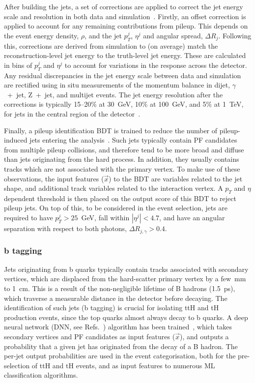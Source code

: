 After building the jets, a set of corrections are applied to correct the jet energy scale and resolution in both data and simulation~\cite{Khachatryan:2016kdb}. Firstly, an offset correction is applied to account for any remaining contributions from pileup. This depends on the event energy density, $\rho$, and the jet $p_T^j$, $\eta^j$ and angular spread, $\Delta R_j$. Following this, corrections are derived from simulation to (on average) match the reconstruction-level jet energy to the truth-level jet energy. These are calculated in bins of $p_T^j$ and $\eta^j$ to account for variations in the response across the detector. Any residual discrepancies in the jet energy scale between data and simulation are rectified using in situ measurements of the momentum balance in dijet, $\gamma$~+~jet, Z~+~jet, and multijet events. The jet energy resolution after the corrections is typically 15--20\% at 30~GeV, 10\% at 100~GeV, and 5\% at 1~TeV, for jets in the central region of the detector~\cite{Khachatryan:2016kdb}.

Finally, a pileup identification BDT is trained to reduce the number of pileup-induced jets entering the analysis~\cite{Sirunyan:2020foa}. Such jets typically contain PF candidates from multiple pileup collisions, and therefore tend to be more broad and diffuse than jets originating from the hard process. In addition, they usually contains tracks which are not associated with the primary vertex. To make use of these observations, the input features ($\vec{x}$) to the BDT are variables related to the jet shape, and additional track variables related to the interaction vertex. A $p_T$ and $\eta$ dependent threshold is then placed on the output score of this BDT to reject pileup jets. On top of this, to be considered in the event selection, jets are required to have $p_T^j>25$~GeV, fall within $|\eta^j|<4.7$, and have an angular separation with respect to both photons, $\Delta R_{j,\gamma}>0.4$.

\subsubsection{b tagging}
Jets originating from b quarks typically contain tracks associated with secondary vertices, which are displaced from the hard-scatter primary vertex by a few~mm to 1~cm. This is a result of the non-negligible lifetime of B hadrons (1.5~ps), which traverse a measurable distance in the detector before decaying. The identification of such jets (b tagging) is crucial for isolating ttH and tH production events, since the top quarks almost always decay to b quarks. A deep neural network (DNN, see Refs.~\cite{hastie01statisticallearning,10.5555/3086952,bishop:2006:PRML}) algorithm has been trained~\cite{Sirunyan:2017ezt}, which takes secondary vertices and PF candidates as input features ($\vec{x}$), and outputs a probability that a given jet has originated from the decay of a B hadron. The per-jet output probabilities are used in the event categorisation, both for the pre-selection of ttH and tH events, and as input features to numerous ML classification algorithms.

